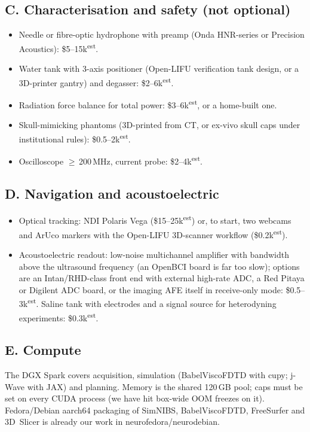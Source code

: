 \documentclass[11pt,a4paper]{article}
\newcommand{\est}{\textsuperscript{est}}
\begin{document}
\subsection*{C. Characterisation and safety (not optional)}
\begin{itemize}[leftmargin=*,nosep]
\item Needle or fibre-optic hydrophone with preamp (Onda HNR-series or Precision Acoustics): \$5--15k\est.
\item Water tank with 3-axis positioner (Open-LIFU verification tank design, or a 3D-printer gantry) and degasser: \$2--6k\est.
\item Radiation force balance for total power: \$3--6k\est, or a home-built one.
\item Skull-mimicking phantoms (3D-printed from CT, or ex-vivo skull caps under institutional rules): \$0.5--2k\est.
\item Oscilloscope $\geq$\,200\,MHz, current probe: \$2--4k\est.
\end{itemize}

\subsection*{D. Navigation and acoustoelectric}
\begin{itemize}[leftmargin=*,nosep]
\item Optical tracking: NDI Polaris Vega (\$15--25k\est) or, to start, two webcams and ArUco markers with the Open-LIFU 3D-scanner workflow (\$0.2k\est).
\item Acoustoelectric readout: low-noise multichannel amplifier with bandwidth above the ultrasound frequency (an OpenBCI board is far too slow); options are an Intan/RHD-class front end with external high-rate ADC, a Red Pitaya or Digilent ADC board, or the imaging AFE itself in receive-only mode: \$0.5--3k\est. Saline tank with electrodes and a signal source for heterodyning experiments: \$0.3k\est.
\end{itemize}

\subsection*{E. Compute}
The DGX Spark covers acquisition, simulation (BabelViscoFDTD with cupy; j-Wave with JAX) and planning. Memory is the shared 120\,GB pool; caps must be set on every CUDA process (we have hit box-wide OOM freezes on it). Fedora/Debian aarch64 packaging of SimNIBS, BabelViscoFDTD, FreeSurfer and 3D~Slicer is already our work in neurofedora/neurodebian.
\end{document}
